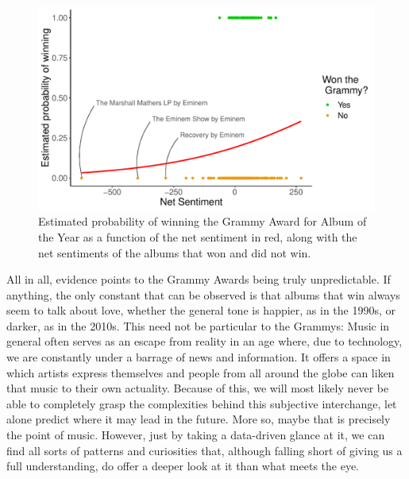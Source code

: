 \documentclass{article}
\begin{document}
\begin{figure}[h]
    \centering
    \includegraphics[scale=0.5]{Plots/graph_logistic_regression_outliers.pdf}
    \caption{Estimated probability of winning the Grammy Award for Album of the Year as a function of the net sentiment in red, along with the net sentiments of the albums that won and did not win.}
    \label{fig:logistic_regression}
\end{figure}


\FloatBarrier

All in all, evidence points to the Grammy Awards being truly unpredictable. If anything, the only constant that can be observed is that albums that win always seem to talk about love, whether the general tone is happier, as in the 1990s, or darker, as in the 2010s. This need not be particular to the Grammys: Music in general often serves as an escape from reality in an age where, due to technology, we are constantly under a barrage of news and information. It offers a space in which artists express themselves and people from all around the globe can liken that music to their own actuality. Because of this, we will most likely never be able to completely grasp the complexities behind this subjective interchange, let alone predict where it may lead in the future. More so, maybe that is precisely the point of music. However, just by taking a data-driven glance at it, we can find all sorts of patterns and curiosities that, although falling short of giving us a full understanding, do offer a deeper look at it than what meets the eye.




\FloatBarrier
\nocite{*}

\end{document}
